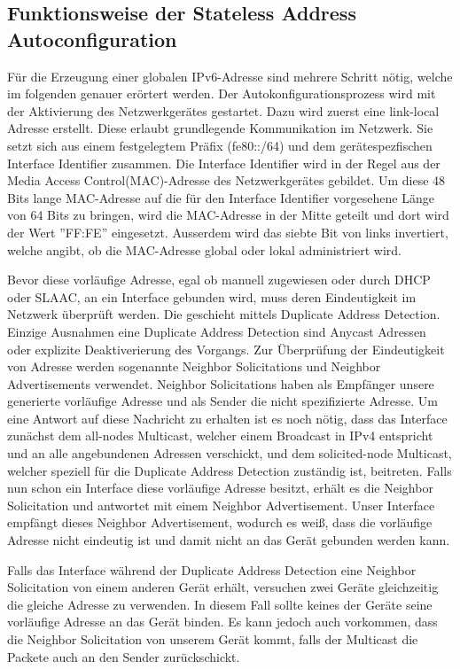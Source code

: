 \documentclass[a4paper, 12pt]{scrartcl}
\begin{document}
\subsection{Funktionsweise der Stateless Address Autoconfiguration}
Für die Erzeugung einer globalen IPv6-Adresse sind mehrere Schritt nötig, welche im folgenden genauer erörtert werden.
Der Autokonfigurationsprozess wird mit der Aktivierung des Netzwerkgerätes gestartet.
Dazu wird zuerst eine link-local Adresse erstellt. Diese erlaubt grundlegende Kommunikation im Netzwerk.
Sie  setzt sich aus einem festgelegtem Präfix (fe80::/64) und dem gerätespezfischen Interface Identifier zusammen.
Die Interface Identifier wird in der Regel aus der Media Access Control(MAC)-Adresse des Netzwerkgerätes gebildet.
Um diese 48 Bits lange MAC-Adresse auf die für den Interface Identifier vorgesehene Länge von 64 Bits zu bringen, wird die MAC-Adresse in der Mitte geteilt und dort wird der Wert ''FF:FE'' eingesetzt. Ausserdem wird das siebte Bit von links invertiert, welche angibt, ob die MAC-Adresse global oder lokal administriert wird.

Bevor diese vorläufige Adresse, egal ob manuell zugewiesen oder durch DHCP oder SLAAC, an ein Interface gebunden wird, muss deren Eindeutigkeit im Netzwerk überprüft werden. Die geschieht mittels Duplicate Address Detection.
Einzige Ausnahmen eine Duplicate Address Detection sind Anycast Adressen oder explizite Deaktiverierung des Vorgangs.
Zur Überprüfung der Eindeutigkeit von Adresse werden sogenannte Neighbor Solicitations und Neighbor Advertisements verwendet. Neighbor Solicitations haben als Empfänger unsere generierte vorläufige Adresse und als Sender die nicht spezifizierte Adresse.
Um eine Antwort auf diese Nachricht zu erhalten ist es noch nötig, dass das Interface zunächst dem all-nodes Multicast, welcher einem Broadcast in IPv4 entspricht und an alle angebundenen Adressen verschickt, und dem solicited-node Multicast, welcher speziell für die Duplicate Address Detection zuständig ist, beitreten.
Falls nun schon ein Interface diese vorläufige Adresse besitzt, erhält es die Neighbor Solicitation und antwortet mit einem Neighbor Advertisement. 
Unser Interface empfängt dieses Neighbor Advertisement, wodurch es weiß, dass die vorläufige Adresse nicht eindeutig ist und damit nicht an das Gerät gebunden werden kann.

Falls das Interface während der Duplicate Address Detection eine Neighbor Solicitation von einem anderen Gerät erhält, versuchen zwei Geräte gleichzeitig die gleiche Adresse zu verwenden. In diesem Fall sollte keines der Geräte seine vorläufige Adresse an das Gerät binden. Es kann jedoch auch vorkommen, dass die Neighbor Solicitation von unserem Gerät kommt, falls der Multicast die Packete auch an den Sender zurückschickt.
\end{document}
